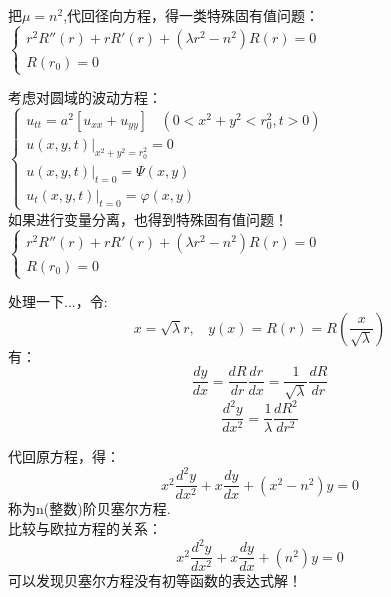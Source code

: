 \begin{frame}
	把$\mu=n^2$,代回径向方程，得一类特殊固有值问题：
	$ \begin{cases}
		r^2 R'' (r)+r R'(r) +( \lambda r^2 -n^2)R(r)=0  \\
		R(r_0)=0
	\end{cases} $\\		
\end{frame}	

\begin{frame}
	考虑对圆域的波动方程：\\
	$\begin{cases}
		u_{tt}=a^2 [u_{xx}   +u_{yy}] ~~~~ (0< x^2 +y^2 <r_0 ^2, t>0)\\
		u(x,y,t)|_{x^2+y^2=r_0 ^2}= 0 \\
		u(x,y,t)|_{t=0}= \Psi(x,y) \\
		u_t (x,y,t)|_{t=0}= \varphi  (x,y) 
	\end{cases} $\\		
	如果进行变量分离，也得到特殊固有值问题！
	$\begin{cases}
		r^2 R'' (r)+r R'(r) +( \lambda r^2 -n^2)R(r)=0  \\
		R(r_0)=0
	\end{cases} $\\		
\end{frame}	

\begin{frame}
	处理一下...，令:
	\begin{equation*}
		x=\sqrt{\lambda} r, ~~~~y(x)= R(r) =R(\frac{x}{\sqrt{\lambda}})
	\end{equation*}
	有： 
	\begin{equation*}
		\frac{dy}{dx} = \frac{dR}{dr} \frac{dr}{dx} = \frac{1}{ \sqrt{\lambda}} \frac{dR}{dr}
	\end{equation*}
	\begin{equation*}
		\frac{d^2y}{dx^2} = \frac{1}{\lambda} \frac{dR^2}{dr^2}
	\end{equation*}
\end{frame}	

\begin{frame}
	代回原方程，得：
	\begin{equation*}
		x^2\frac{d^2y}{dx^2} + x\frac{dy}{dx} +(x^2 -n^2)y=0
	\end{equation*}
	称为n(整数)阶贝塞尔方程.\\
	比较与欧拉方程的关系：
	\begin{equation*}
		x^2\frac{d^2y}{dx^2} + x\frac{dy}{dx} +(n^2)y=0
	\end{equation*}
	可以发现贝塞尔方程没有初等函数的表达式解！
\end{frame}	

